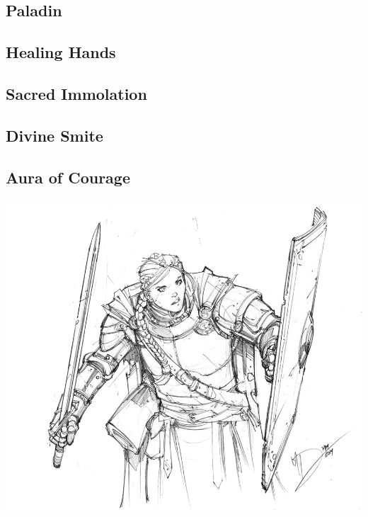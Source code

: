 
\begin{multicols*}{2}

\section{Paladin}

\subsection*{Healing Hands}

\subsection*{Sacred Immolation}

\subsection*{Divine Smite}

\subsection*{Aura of Courage}

\begin{Figure}
\centering
\includegraphics[width=\textwidth]{img/paladin.png}
\end{Figure}
    
\end{multicols*}

    